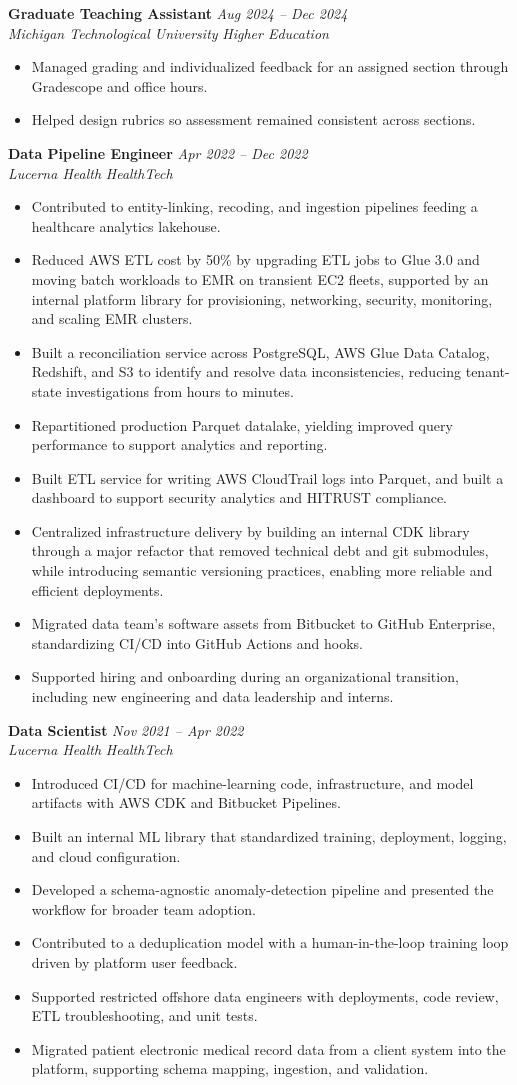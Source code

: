 \documentclass[10pt,letterpaper]{article}
\newcommand{\resumeItem}[1]{\item \small #1}
\newcommand{\resumeSubheading}[4]{%
  \textbf{#1} \hfill \small{\textit{#2}}\\
  \small{\textit{#3}} \hfill \small{\textit{#4}}\par
}
\begin{document}
\resumeSubheading{Graduate Teaching Assistant}{Aug 2024 -- Dec 2024}{Michigan Technological University}{Higher Education}
\begin{itemize}
  \resumeItem{Managed grading and individualized feedback for an assigned section through Gradescope and office hours.}
  \resumeItem{Helped design rubrics so assessment remained consistent across sections.}
\end{itemize}

\resumeSubheading{Data Pipeline Engineer}{Apr 2022 -- Dec 2022}{Lucerna Health}{HealthTech}
\begin{itemize}
  \resumeItem{Contributed to entity-linking, recoding, and ingestion pipelines feeding a healthcare analytics lakehouse.}
  \resumeItem{Reduced AWS ETL cost by 50\% by upgrading ETL jobs to Glue 3.0 and moving batch workloads to EMR on transient EC2 fleets, supported by an internal platform library for provisioning, networking, security, monitoring, and scaling EMR clusters.}
  \resumeItem{Built a reconciliation service across PostgreSQL, AWS Glue Data Catalog, Redshift, and S3 to identify and resolve data inconsistencies,
  reducing tenant-state investigations from hours to minutes.}
  \resumeItem{Repartitioned production Parquet datalake, yielding improved query performance to support analytics and reporting.}
  \resumeItem{Built ETL service for writing AWS CloudTrail logs into Parquet, and built a dashboard to support security analytics and HITRUST compliance.}
  \resumeItem{Centralized infrastructure delivery by building an internal CDK library through a major refactor that removed technical debt and git submodules, while introducing semantic versioning practices, enabling more reliable and efficient deployments.}
  \resumeItem{Migrated data team's software assets from Bitbucket to GitHub Enterprise, standardizing CI/CD into GitHub Actions and hooks.}
  \resumeItem{Supported hiring and onboarding during an organizational transition, including new engineering and data leadership and interns.}
\end{itemize}

\resumeSubheading{Data Scientist}{Nov 2021 -- Apr 2022}{Lucerna Health}{HealthTech}
\begin{itemize}
  \resumeItem{Introduced CI/CD for machine-learning code, infrastructure, and model artifacts with AWS CDK and Bitbucket Pipelines.}
  \resumeItem{Built an internal ML library that standardized training, deployment, logging, and cloud configuration.}
  \resumeItem{Developed a schema-agnostic anomaly-detection pipeline and presented the workflow for broader team adoption.}
  \resumeItem{Contributed to a deduplication model with a human-in-the-loop training loop driven by platform user feedback.}
  \resumeItem{Supported restricted offshore data engineers with deployments, code review, ETL troubleshooting, and unit tests.}
  \resumeItem{Migrated patient electronic medical record data from a client system into the platform, supporting schema mapping, ingestion, and validation.}
\end{itemize}
\end{document}
